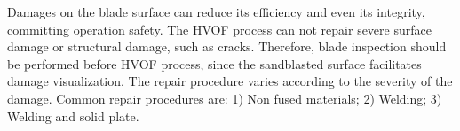 
Damages on the blade surface can reduce its efficiency and even its integrity,
committing operation safety. The HVOF process can not repair severe surface
damage or structural damage, such as cracks. Therefore, blade inspection should
be performed before HVOF process, since the sandblasted surface facilitates
damage visualization.
The repair procedure varies according to the severity of
the damage. Common repair procedures are: 1) Non fused materials; 2) Welding;  
3) Welding and solid plate.


